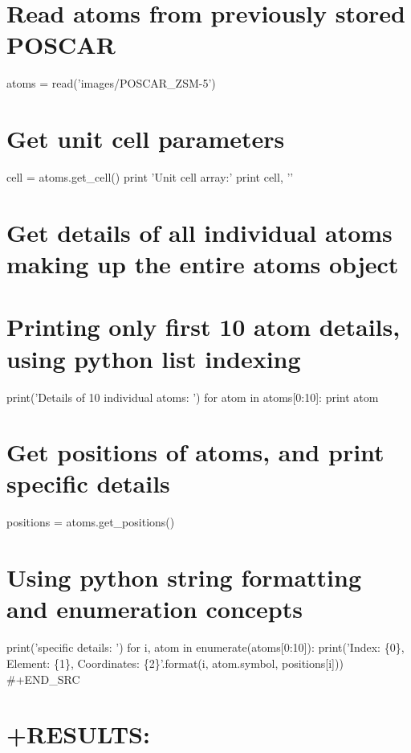 \documentclass[11pt]{article}
\begin{document}
\section{Read atoms from previously stored
POSCAR}\label{read-atoms-from-previously-stored-poscar}

atoms = read('images/POSCAR\_ZSM-5')

\section{Get unit cell parameters}\label{get-unit-cell-parameters}

cell = atoms.get\_cell() print 'Unit cell array:' print cell, '\n'

\section{Get details of all individual atoms making up the entire atoms
object}\label{get-details-of-all-individual-atoms-making-up-the-entire-atoms-object}

\section{Printing only first 10 atom details, using python list
indexing}\label{printing-only-first-10-atom-details-using-python-list-indexing}

print('Details of 10 individual atoms: ') for atom in atoms{[}0:10{]}:
print atom

\section{Get positions of atoms, and print specific
details}\label{get-positions-of-atoms-and-print-specific-details}

positions = atoms.get\_positions()

\section{Using python string formatting and enumeration
concepts}\label{using-python-string-formatting-and-enumeration-concepts}

print('\nAtom specific details: ') for i, atom in
enumerate(atoms{[}0:10{]}): print('Index: \{0\}, Element: \{1\},
Coordinates: \{2\}'.format(i, atom.symbol, positions{[}i{]}))
\#+END\_SRC

\section{+RESULTS:}\label{results-12}
\end{document}
